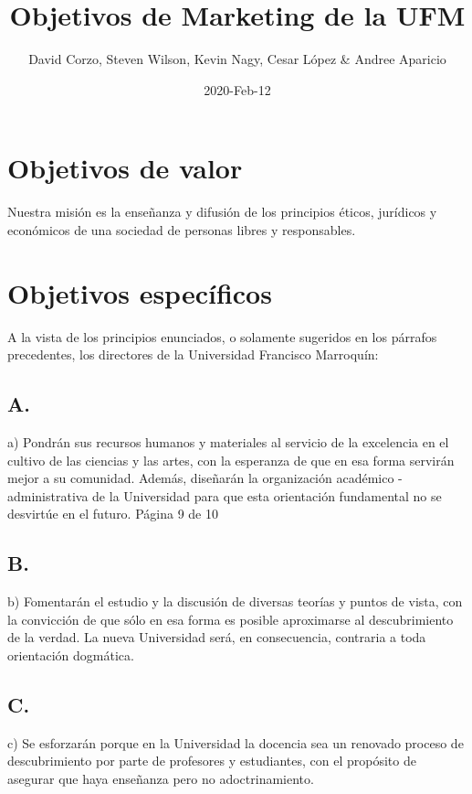 \documentclass{article}
\title{Objetivos de Marketing de la UFM}
\author{David Corzo, Steven Wilson, Kevin Nagy, Cesar López \& Andree Aparicio}
\date{2020-Feb-12}
\begin{document}
\maketitle


\section{Objetivos de valor}
Nuestra misión es la enseñanza y difusión de los principios éticos, jurídicos y económicos de una sociedad de personas libres y responsables.

\section{Objetivos específicos}
A la vista de los principios enunciados, o solamente sugeridos en los párrafos precedentes, los directores de la Universidad Francisco Marroquín:


\subsection{A.}
a) Pondrán sus recursos humanos y materiales al servicio de la excelencia en el cultivo de las ciencias y las artes, con la esperanza de que en esa forma servirán mejor a su comunidad. Además, diseñarán la organización académico - administrativa de la Universidad para que esta orientación fundamental no se desvirtúe en el futuro.
Página 9 de 10

\subsection{B.}
b) Fomentarán el estudio y la discusión de diversas teorías y puntos de vista, con la convicción de que sólo en esa forma es posible aproximarse al descubrimiento de la verdad. La nueva Universidad será, en consecuencia, contraria a toda orientación dogmática.

\subsection{C.}
c) Se esforzarán porque en la Universidad la docencia sea un renovado proceso de descubrimiento por parte de profesores y estudiantes, con el propósito de asegurar que haya enseñanza pero no adoctrinamiento.
\end{document}
